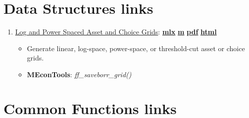 \documentclass[
]{book}
\providecommand{\tightlist}{%
  \setlength{\itemsep}{0pt}\setlength{\parskip}{0pt}}
\begin{document}
\hypertarget{data-structures-links}{%
\section{Data Structures links}\label{data-structures-links}}

\begin{enumerate}
\def\labelenumi{\arabic{enumi}.}
\tightlist
\item
  \href{https://fanwangecon.github.io/MEconTools/MEconTools/doc/generate/htmlpdfm/fx_saveborr_grid.html}{Log and Power Spaced Asset and Choice Grids}: \href{https://github.com/FanWangEcon/MEconTools/blob/master/MEconTools/doc/generate/fx_saveborr_grid.mlx}{\textbf{mlx}} \textbar{} \href{https://github.com/FanWangEcon/MEconTools/blob/master/MEconTools/doc/generate/htmlpdfm/fx_saveborr_grid.m}{\textbf{m}} \textbar{} \href{https://github.com/FanWangEcon/MEconTools/blob/master/MEconTools/doc/generate/htmlpdfm/fx_saveborr_grid.pdf}{\textbf{pdf}} \textbar{} \href{https://fanwangecon.github.io/MEconTools/MEconTools/doc/generate/htmlpdfm/fx_saveborr_grid.html}{\textbf{html}}

  \begin{itemize}
  \tightlist
  \item
    Generate linear, log-space, power-space, or threshold-cut asset or choice grids.
  \item
    \textbf{MEconTools}: \emph{ff\_saveborr\_grid()}
  \end{itemize}
\end{enumerate}

\hypertarget{common-functions-links}{%
\section{Common Functions links}\label{common-functions-links}}
\end{document}
